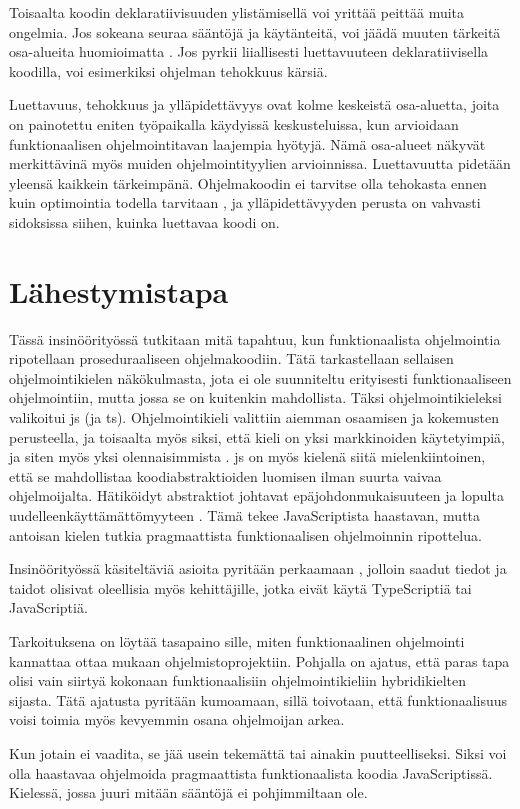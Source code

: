 Toisaalta koodin deklaratiivisuuden ylistämisellä voi yrittää peittää muita ongelmia. Jos sokeana seuraa sääntöjä ja käytänteitä, voi jäädä muuten tärkeitä osa-alueita huomioimatta \cite{functional_fixedness}. Jos pyrkii liiallisesti luettavuuteen deklaratiivisella koodilla, voi esimerkiksi ohjelman tehokkuus kärsiä.

Luettavuus, tehokkuus ja ylläpidettävyys ovat kolme keskeistä osa-aluetta, joita on painotettu eniten työpaikalla käydyissä keskusteluissa, kun arvioidaan funktionaalisen ohjelmointitavan laajempia hyötyjä. Nämä osa-alueet näkyvät merkittävinä myös muiden ohjelmointityylien arvioinnissa. Luettavuutta pidetään yleensä kaikkein tärkeimpänä. Ohjelmakoodin ei tarvitse olla tehokasta ennen kuin optimointia todella tarvitaan \cite{prematureoptimization}, ja ylläpidettävyyden perusta on vahvasti sidoksissa siihen, kuinka luettavaa koodi on.

\section{Lähestymistapa}

Tässä insinöörityössä tutkitaan mitä tapahtuu, kun funktionaalista ohjelmointia ripotellaan proseduraaliseen ohjelmakoodiin. Tätä tarkastellaan sellaisen ohjelmointikielen näkökulmasta, jota ei ole suunniteltu erityisesti funktionaaliseen ohjelmointiin, mutta jossa se on kuitenkin mahdollista. Täksi ohjelmointikieleksi valikoitui \gls{js} (ja \gls{ts}). Ohjelmointikieli valittiin aiemman osaamisen ja kokemusten perusteella, ja toisaalta myös siksi, että kieli on yksi markkinoiden käytetyimpiä, ja siten myös yksi olennaisimmista \cite{pypl:lang}. \Gls{js} on myös kielenä siitä mielenkiintoinen, että se mahdollistaa koodiabstraktioiden luomisen ilman suurta vaivaa ohjelmoijalta. Hätiköidyt abstraktiot johtavat epäjohdonmukaisuuteen ja lopulta uudelleenkäyttämättömyyteen \cite{dijkstra_humble_programmer}. Tämä tekee JavaScriptista haastavan, mutta antoisan kielen tutkia pragmaattista funktionaalisen ohjelmoinnin ripottelua.


Insinöörityössä käsiteltäviä asioita pyritään perkaamaan , jolloin saadut tiedot ja taidot olisivat oleellisia myös kehittäjille, jotka eivät käytä TypeScriptiä tai JavaScriptiä.

Tarkoituksena on löytää tasapaino sille, miten funktionaalinen ohjelmointi kannattaa ottaa mukaan ohjelmistoprojektiin. Pohjalla on ajatus, että paras tapa olisi vain siirtyä kokonaan funktionaalisiin ohjelmointikieliin hybridikielten sijasta. Tätä ajatusta pyritään kumoamaan, sillä toivotaan, että funktionaalisuus voisi toimia myös kevyemmin osana ohjelmoijan arkea.

Kun jotain ei vaadita, se jää usein tekemättä tai ainakin puutteelliseksi. Siksi voi olla haastavaa ohjelmoida pragmaattista funktionaalista koodia JavaScriptissä. Kielessä, jossa juuri mitään sääntöjä ei pohjimmiltaan ole.
